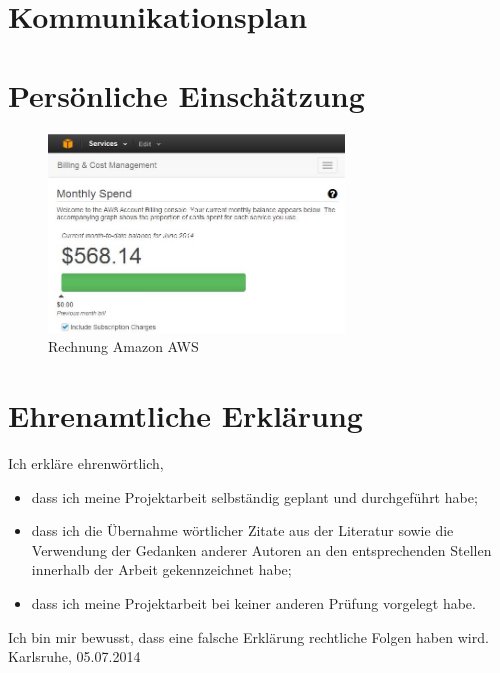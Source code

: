 \documentclass{article}
\begin{document}
\section{Kommunikationsplan}

\section{Persönliche Einschätzung}
\begin{figure}[H]
    \centering
    \includegraphics[width=0.7\textwidth]{images/amazon-bill.jpg}
    \caption{Rechnung Amazon AWS}
    \label{fig:bill}
\end{figure}

\section{Ehrenamtliche Erklärung}

Ich erkläre ehrenwörtlich,
\begin{itemize}
    \item dass ich meine Projektarbeit selbständig geplant und durchgeführt habe;
    \item dass ich die Übernahme wörtlicher Zitate aus der Literatur sowie die Verwendung der Gedanken anderer Autoren an den entsprechenden Stellen innerhalb der Arbeit gekennzeichnet habe;
    \item dass ich meine Projektarbeit bei keiner anderen Prüfung
    vorgelegt habe.
\end{itemize}
Ich bin mir bewusst, dass eine falsche Erklärung rechtliche Folgen haben wird. \\

\vspace{1cm}
Karlsruhe, 05.07.2014 
\end{document}
